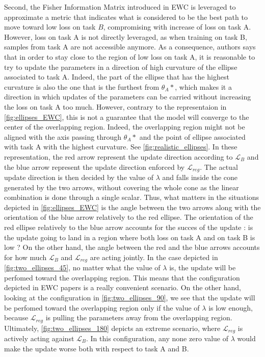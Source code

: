 \documentclass[11pt]{article}
\begin{document}
\vspace{2mm}
\noindent
Second, the Fisher Information Matrix introduced in EWC is leveraged to approximate a metric that indicates what is considered to be the best path to move toward low loss on task $B$, compromising with increase of loss on task A. However, loss on task A is not directly leveraged, as when training on task B, samples from task A are not accessible anymore. As a consequence, authors says that in order to stay close to the region of low loss on task A, it is reasonable to try to update the parameters in a direction of high curvature of the ellipse associated to task A. Indeed, the part of the ellipse that has the highest curvature is also the one that is the furthest from $\theta_A*$, which makes it a direction in which updates of the parameters can be carried without increasing the loss on task A too much. However, contrary to the representaion in \ref{fig:ellipses_EWC}, this is not a guarantee that the model will converge to the center of the overlapping region. Indeed, the overlapping region might not be aligned with the axis passing through $\theta_A*$ and the point of ellipse associated with task A with the highest curvature. See \ref{fig:realistic_ellipses}. In these representation, the red arrow represent the update direction according to $\mathcal{L}_{B}$ and the blue arrow represent the update direction enforced by $\mathcal{L}_{reg}$. The actual update direction is then decided by the value of $\lambda$ and falls inside the cone generated by the two arrows, without covering the whole cone as the linear combination is done through a single scalar. Thus, what matters in the situations depicted in \ref{fig:ellipses_EWC} is the angle between the two arrows along with the orientation of the blue arrow relatively to the red ellipse. The orientation of the red ellipse relatively to the blue arrow accounts for the succes of the update : is the update going to land in a region where both loss on task A and on task B is low ? On the other hand, the angle between the red and the blue arrows accounts for how much $\mathcal{L}_{B}$ and $\mathcal{L}_{reg}$ are acting jointly. In the case depicted in \ref{fig:two_ellipses_45}, no matter what the value of $\lambda$ is, the update will be perfomed toward the overlapping region. This means that the configuration depicted in EWC papers is a really convenient scenario. On the other hand, looking at the configuration in \ref{fig:two_ellipses_90}, we see that the update will be perfomed toward the overlapping region only if the value of $\lambda$ is low enough, because $\mathcal{L}_{reg}$ is pulling the parameters away from the overlapping region. Ultimately, \ref{fig:two_ellipses_180} depicts an extreme scenario, where $\mathcal{L}_{reg}$ is actively acting against $\mathcal{L}_B$. In this configuration, any none zero value of $\lambda$ would make the update worse both with respect to task A and B.
\end{document}
